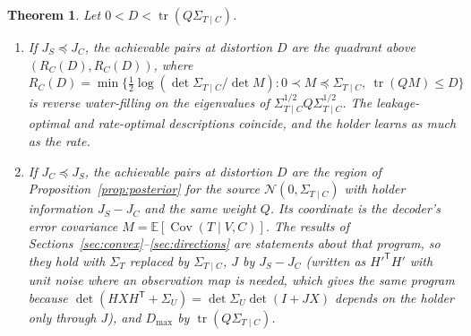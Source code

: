 \documentclass[11pt,onecolumn]{IEEEtran}
\newtheorem{theorem}{Theorem}
\newcommand{\E}{\mathbb{E}}
\newcommand{\tr}{\operatorname{tr}}
\newcommand{\Cov}{\operatorname{Cov}}
\begin{document}
\begin{theorem}\label{thm:decsi}
Let $0<D<\tr(Q\Sigma_{T\mid C})$.
\begin{enumerate}
\item[(a)] If $J_S\preceq J_C$, the achievable pairs at distortion $D$ are
the quadrant above $(R_C(D),R_C(D))$, where
$R_C(D)=\min\{\tfrac12\log(\det\Sigma_{T\mid C}/\det M):0\prec M\preceq\Sigma_{T\mid C},\ \tr(QM)\le D\}$
is reverse water-filling on the eigenvalues of
$\Sigma_{T\mid C}^{1/2}Q\Sigma_{T\mid C}^{1/2}$. The leakage-optimal and
rate-optimal descriptions coincide, and the holder learns as much as the
rate.
\item[(b)] If $J_C\preceq J_S$, the achievable pairs at distortion $D$ are
the region of Proposition~\ref{prop:posterior} for the source
$\mathcal N(0,\Sigma_{T\mid C})$ with holder information $J_S-J_C$ and the
same weight $Q$. Its coordinate is the decoder's error covariance
$M=\E[\Cov(T\mid V,C)]$. The results of
Sections~\ref{sec:convex}--\ref{sec:directions} are statements about that
program, so they hold with $\Sigma_T$ replaced by $\Sigma_{T\mid C}$, $J$
by $J_S-J_C$ (written as $H'^{\mathsf T}H'$ with unit noise where an
observation map is needed, which gives the same program because
$\det(HXH^{\mathsf T}+\Sigma_U)=\det\Sigma_U\det(I+JX)$ depends on the
holder only through $J$), and $D_{\max}$ by $\tr(Q\Sigma_{T\mid C})$.
\end{enumerate}
\end{theorem}
\end{document}
